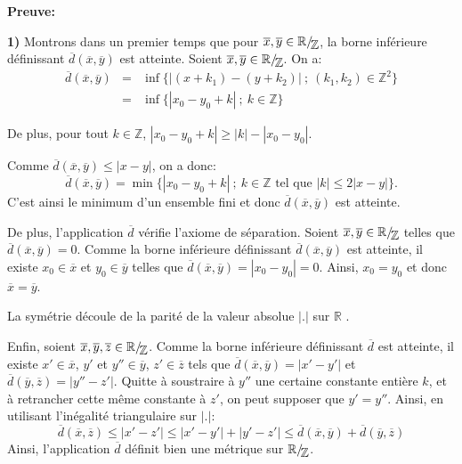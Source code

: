 \documentclass[11pt,a4 paper]{article}
\newcommand{\Rbb}{\mathbb{R}}
\newcommand{\Zbb}{\mathbb{Z}}
\newcommand*{\EnsembleQuotient}[2]%
{\ensuremath{%
		#1/\!\raisebox{-.65ex}{\ensuremath{\mathcal{#2}}}}}
\begin{document}
	\textbf{Preuve:}
	\par\textbf{1)} Montrons dans un premier temps que pour $\overline{x}, \overline{y} \in \EnsembleQuotient{\Rbb}{\Zbb}$, la borne inférieure définissant $\overline{d}(\overline{x},\overline{y})$ est atteinte. Soient $\overline{x}, \overline{y}\in \EnsembleQuotient{\Rbb}{\Zbb}$. On a:
	\begin{eqnarray*}
			\overline{d}(\overline{x},\overline{y})&=&\inf\big\lbrace |(x+k_1)-(y+k_2)|\ ;\ (k_1,k_2)\in \Zbb^2\big\rbrace\\
			&=&\inf \big\lbrace |x_0-y_0+k|\ ;\ k \in \Zbb\big\rbrace
	\end{eqnarray*}
	
	
	De plus, pour  tout $k \in \Zbb$, $|x_0-y_0 +k|\geq |k|-|x_0-y_0|$.

	Comme $\overline{d}(\overline{x},\overline{y})\leq |x-y|$, on a donc:
	$$\overline{d}(\overline{x},\overline{y})= \min \lbrace |x_0-y_0+k|\ ;\ k \in \Zbb \text{ tel que } |k|\leq 2|x-y|\rbrace.$$
	C'est ainsi le minimum d'un ensemble fini et donc $\overline{d}(\overline{x},\overline{y})$ est atteinte.\\

	\par De plus, l'application $\overline{d}$ vérifie l'axiome de séparation. Soient $\overline{x}, \overline{y} \in \EnsembleQuotient{\Rbb}{\Zbb}$ telles que $\overline{d}(\overline{x},\overline{y}) = 0$. Comme la borne inférieure définissant $\overline{d}(\overline{x},\overline{y})$ est atteinte, il existe $x_0 \in \overline{x}$ et $y_0 \in \overline{y}$ telles que $\overline{d}(\overline{x},\overline{y})=|x_0-y_0|=0$. Ainsi, $x_0=y_0$ et donc $\overline{x}= \overline{y}$.\\

	\par La symétrie découle de la parité de la valeur absolue $|.|$ sur $\Rbb$ .\\

	\par Enfin, soient $\overline{x},\overline{y}, \overline{z} \in \EnsembleQuotient{\Rbb}{\Zbb}$. Comme la borne inférieure définissant $\overline{d}$ est atteinte, il existe $x'\in \overline{x}$, $y'$ et $y'' \in \overline{y}$, $z' \in \overline{z}$ tels que $\overline{d}(\overline{x},\overline{y})=|x'-y'|$ et $\overline{d}(\overline{y},\overline{z})=|y''-z'|$. Quitte à soustraire à $y''$ une certaine constante entière $k$, et à retrancher cette même constante à $z'$, on peut supposer que $y'=y''$. Ainsi, en utilisant l'inégalité triangulaire sur $|.|$:
	$$\overline{d}(\overline{x},\overline{z})\leq |x'-z'| \leq |x'-y'|+|y'-z'|\leq \overline{d}(\overline{x},\overline{y})+\overline{d}(\overline{y},\overline{z})$$
	Ainsi, l'application $\overline{d}$ définit bien une métrique sur $\EnsembleQuotient{\Rbb}{\Zbb}$.\\
	
\end{document}
